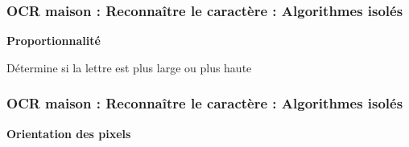 \documentclass[xcolor=dvipsnames]{beamer}
\begin{document}
\begin{frame}
  \frametitle{OCR maison : Reconnaître le caractère : Algorithmes isolés}

  \begin{center}\begin{alertblock}{}
    \begin{center}\textbf{\Large Proportionnalité}\end{center}
  \end{alertblock}\end{center}

  \begin{center}
      Détermine si la lettre est plus large ou plus haute
  \end{center}
  
\end{frame}


\begin{frame}
  \frametitle{OCR maison : Reconnaître le caractère : Algorithmes isolés}

  \begin{center}\begin{alertblock}{}
    \begin{center}\textbf{\Large Orientation des pixels}\end{center}
  \end{alertblock}\end{center}

\end{frame}
\end{document}
